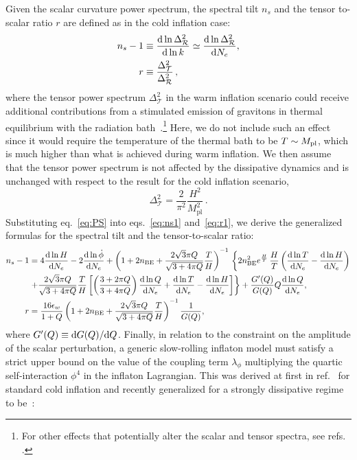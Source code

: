 \documentclass[a4paper,11pt]{article}
\begin{document}
Given the scalar curvature power spectrum, the spectral tilt $n_s$ and the tensor to-scalar ratio $r$ are defined as in the cold inflation case:
\begin{align}
    n_s-1& \equiv \frac{{\rm d}\ln \Delta^2_{\mathcal{R}}}{{\rm d}\ln k}\simeq \frac{{\rm d}\ln \Delta^2_{\mathcal{R}}}{{\rm d}N_e},\label{eq:ns1} \\
    r& \equiv \frac{\Delta_{\mathcal{T}}^2}{\Delta^2_{\mathcal{R}}}\,, \label{eq:r1}
\end{align}
where the tensor power spectrum $\Delta^2_{\mathcal{T}}$ in the warm inflation scenario could receive additional contributions from a stimulated emission of gravitons in thermal equilibrium with the radiation bath~\cite{Bhattacharya:2006dm}.\footnote{For other effects that potentially alter the scalar and tensor spectra, see refs. \cite{Namba:2015gja,Peloso:2016gqs}.} Here, we do not include such an effect since it would require the temperature of the thermal bath to be $T \sim M_{\rm pl}$, which is much higher than what is achieved during warm inflation. We then assume that the tensor power spectrum is not affected by the dissipative dynamics and is unchanged with respect to the result for the cold inflation scenario,
\begin{equation}
    \Delta^2_{\mathcal{T}} = \frac{2}{\pi^2} \frac{H^2}{M_{\mathrm{pl}}^2}\,.
\end{equation}
Substituting eq.~\eqref{eq:PS} into eqs.~\eqref{eq:ns1} and~\eqref{eq:r1}, we derive the generalized formulas for the spectral tilt and the tensor-to-scalar ratio:
\begin{align}
    n_s-1&=4\frac{{\rm d}\ln H}{{\rm d}N_e}-2\frac{{\rm d}\ln \dot{\phi}}{{\rm d}N_e}+\left(1+2 n_{\mathrm{BE}}+\frac{2 \sqrt{3} \pi Q}{\sqrt{3+4 \pi Q}} \frac{T}{H}\right)^{-1}\,\left\{ 2n_{\mathrm{BE}}^2e^{\frac{H}{T}}\,\frac{H}{T}\left(\frac{{\rm d}\ln T}{{\rm d}N_e}-\frac{{\rm d}\ln H}{{\rm d}N_e}\right)\right. \nonumber \\
    &\left. +\frac{2 \sqrt{3} \pi Q}{\sqrt{3+4 \pi Q}} \frac{T}{H}\left[ \left(\frac{3+2\pi Q}{3+4\pi Q}\right)\frac{{\rm d}\ln Q}{{\rm d}N_e}+\frac{{\rm d}\ln T}{{\rm d}N_e}-\frac{{\rm d}\ln H}{{\rm d}N_e}\right]\right\} +\frac{ G^\prime(Q)}{G(Q)}Q\frac{{\rm d}\ln Q}{{\rm d}N_e}, \label{eq:ns2}\\
     r&=\frac{16 \epsilon_{w}}{1+Q}\left(1+2 n_{\mathrm{BE}}+\frac{2 \sqrt{3} \pi Q}{\sqrt{3+4 \pi Q}} \frac{T}{H}\right)^{-1} \frac{1}{G(Q)}, \label{eq:r2}
\end{align}
where $G^\prime(Q)\equiv {\rm d}G(Q)/{\rm d}Q$. Finally, in relation to the constraint on the amplitude of the scalar perturbation, a generic slow-rolling inflaton model must satisfy a strict upper bound on the value of the coupling term $\lambda_\phi$ multiplying the quartic self-interaction $\phi^4$ in the inflaton Lagrangian. This was derived at first in ref.~\cite{Adams:1990pn} for standard cold inflation and recently generalized for a strongly dissipative regime to be~\cite{Montefalcone:2022owy}:
\end{document}
